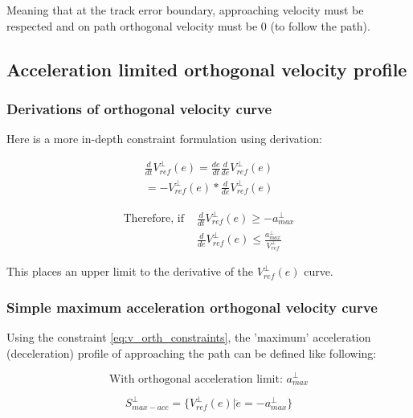Meaning that at the track error boundary,  approaching velocity must be respected and on path orthogonal velocity must be 0 (to follow the path).\newline

\subsection{Acceleration limited orthogonal velocity profile}

\subsubsection{Derivations of orthogonal velocity curve}
Here is a more in-depth constraint formulation using derivation:

\begin{equation}
    \begin{split}
    \frac{d}{dt}V_{ref}^{\perp}(e) = \frac{de}{dt}\frac{d}{de}V_{ref}^{\perp}(e)\\
    = -V_{ref}^{\perp}(e) * \frac{d}{de}V_{ref}^{\perp}(e)
    \end{split}
\end{equation}

\begin{equation}
\begin{split}
    \text{Therefore, if } &\frac{d}{dt}V_{ref}^{\perp}(e) \geq -a^{\perp}_{max}\\
    &\frac{d}{de}V_{ref}^{\perp}(e) \leq \frac{a^{\perp}_{max}}{V_{ref}^{\perp}}
    \label{eq:accel_limit_orth_vel_deriv}
\end{split}
\end{equation}

This places an upper limit to the derivative of the $V_{ref}^{\perp}(e)$ curve.

\subsubsection{Simple maximum acceleration orthogonal velocity curve}
Using the constraint \autoref{eq:v_orth_constraints}, the 'maximum' acceleration (deceleration) profile of approaching the path can be defined like following:

\begin{equation}
    \text{With orthogonal acceleration limit: } a^{\perp}_{max}
\end{equation}

\begin{equation}
    S^{\perp}_{max-acc} = \{V_{ref}^{\perp}(e) | \ddot{e} = -a^{\perp}_{max}\}
\end{equation}

